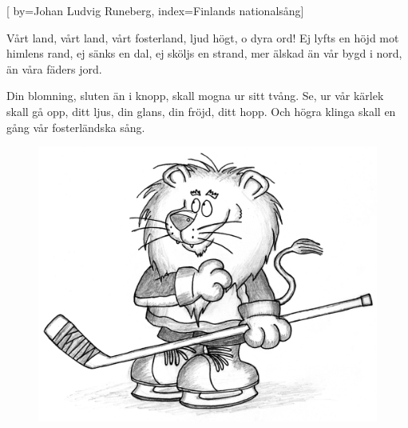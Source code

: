 %

[
  by={Johan Ludvig Runeberg},
  index={Finlands nationalsång}]  
  
\beginverse*
Vårt land, vårt land, vårt fosterland,
ljud högt, o dyra ord!
Ej lyfts en höjd mot himlens rand,
ej sänks en dal, ej sköljs en strand,
mer älskad än vår bygd i nord,
än våra fäders jord.
\endverse

\beginverse*
Din blomning, sluten än i knopp,
skall mogna ur sitt tvång.
Se, ur vår kärlek skall gå opp,
ditt ljus, din glans, din fröjd, ditt hopp.
Och högra klinga skall en gång
vår fosterländska sång.
\endverse
\endsong

\begin{figure}[!b]
\begin{center}
\includegraphics[scale=.35]{../bilder/vart_land.png} 
\end{center}
\end{figure}